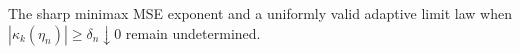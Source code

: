 The sharp minimax MSE exponent and a uniformly valid adaptive limit law when \(|\kappa_k(\eta_n)|\ge\delta_n\downarrow0\) remain undetermined.